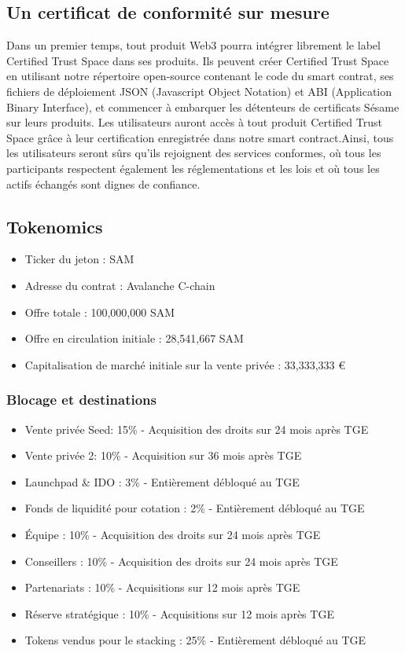 ﻿\documentclass[a4paper]{article}
\let\OldTexttrademark\texttrademark
\renewcommand{\texttrademark}{\OldTexttrademark\xspace}%
\begin{document}
\subsection{Un certificat de conformité sur mesure} 
Dans un premier temps, tout produit Web3 pourra intégrer librement le label Certified Trust Space\texttrademark dans ses produits. Ils peuvent créer Certified Trust Space\texttrademark en utilisant notre répertoire open-source contenant le code du smart contrat, ses fichiers de déploiement JSON (Javascript Object Notation) et ABI (Application Binary Interface), et commencer à embarquer les détenteurs de certificats Sésame sur leurs produits. Les utilisateurs auront accès à tout produit Certified Trust Space\texttrademark grâce à leur certification enregistrée dans notre smart contract.Ainsi, tous les utilisateurs seront sûrs qu'ils rejoignent des services conformes, où tous les participants respectent également les réglementations et les lois et où tous les actifs échangés sont dignes de confiance.
\subsection{Tokenomics}
\begin{itemize}
\item Ticker du jeton : SAM
\item Adresse du contrat : Avalanche C-chain
\item Offre totale : 100,000,000 SAM
\item Offre en circulation initiale : 28,541,667 SAM
\item Capitalisation de marché initiale sur la vente privée :  33,333,333 €
\end{itemize}

\subsubsection{Blocage et destinations}
\begin{itemize}
\item Vente privée Seed: 15\% - Acquisition des droits sur 24 mois après TGE
\item Vente privée 2: 10\% - Acquisition sur 36 mois après TGE
\item Launchpad \& IDO : 3\% - Entièrement débloqué au TGE
\item Fonds de liquidité pour cotation : 2\% - Entièrement débloqué au TGE
\item Équipe : 10\% - Acquisition des droits sur 24 mois après TGE
\item Conseillers : 10\% - Acquisition des droits sur 24 mois après TGE
\item Partenariats : 10\% - Acquisitions sur 12 mois après TGE
\item Réserve stratégique : 10\% - Acquisitions sur 12 mois après TGE
\item Tokens vendus pour le stacking : 25\% - Entièrement débloqué au TGE
\end{itemize}
\end{document}
